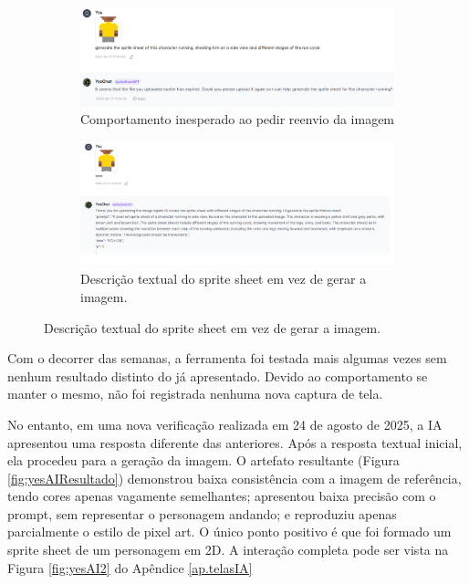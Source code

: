 \begin{figure}[htbp]
    \centering
    \caption{\small Tela do SpriteSheetGPT não gerando o resultado esperado}
    \label{fig:yesAI1Edit}

    \begin{subfigure}{1\linewidth}
        \includegraphics[width=1\linewidth]{figs/yesAI/mono1.PNG}
        \caption{\small Comportamento inesperado ao pedir reenvio da imagem}
        \label{fig:yesAI1aEdit}
    \end{subfigure}
    \begin{subfigure}{1\linewidth}
        \includegraphics[width=1\linewidth]{figs/yesAI/tela2.PNG}
        \caption{\small Descrição textual do sprite sheet em vez de gerar a imagem.}
        \label{fig:yesAI1bEdit}
    \end{subfigure}

\end{figure}

Com o decorrer das semanas, a ferramenta foi testada mais algumas vezes sem nenhum resultado distinto do já apresentado. Devido ao comportamento se manter o mesmo, não foi registrada nenhuma nova captura de tela.


No entanto, em uma nova verificação realizada em 24 de agosto de 2025, a IA apresentou uma resposta diferente das anteriores. Após a resposta textual inicial, ela procedeu para a geração da imagem. O artefato resultante (Figura \ref{fig:yesAIResultado}) demonstrou baixa consistência com a imagem de referência, tendo cores apenas vagamente semelhantes; apresentou baixa precisão com o prompt, sem representar o personagem andando; e reproduziu apenas parcialmente o estilo de pixel art. O único ponto positivo é que foi formado um sprite sheet de um personagem em 2D. A interação completa pode ser vista na Figura \ref{fig:yesAI2} do Apêndice \ref{ap.telasIA}

